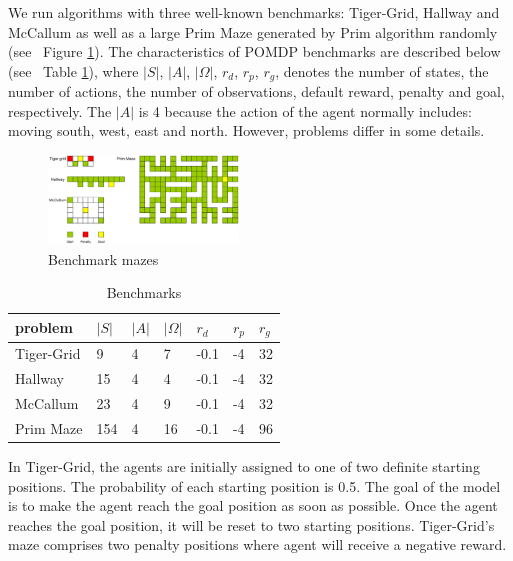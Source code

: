 \documentclass{article}
\begin{document}
We run algorithms with three well-known benchmarks: Tiger-Grid, Hallway and McCallum 
as well as a large Prim Maze generated by Prim algorithm randomly
(see ~Figure \ref{fig:mazes}). The characteristics of POMDP benchmarks are described
below (see ~Table \ref{table:benchmarks}), where $|S|$, $|A|$, $|\Omega|$, $r_d$, $r_p$, $r_g$, 
denotes the number of states, the number of actions, the number of observations, default
reward, penalty and goal, respectively. The $|A|$ is 4 because the action of the agent
normally includes: moving south, west, east and north. However, problems differ in some
details.

\begin{figure}[h]
  \centering
    \includegraphics[width=0.45\textwidth]{mazes.png}
  \caption{Benchmark mazes}
  \label{fig:mazes}
\end{figure}

\begin{table}[h]
  \caption{Benchmarks}
  \label{table:benchmarks}
  \centering
  \begin{tabular}{lllllll}
    \toprule
    problem         & $|S|$          & $|A|$          & $|\Omega|$  &$r_d$  &$r_p$  &$r_g$\\
    \midrule
    Tiger-Grid      & 9              & 4              & 7           & -0.1  & -4    & 32  \\
    Hallway         & 15             & 4              & 4           & -0.1  & -4    & 32  \\
    McCallum        & 23             & 4              & 9           & -0.1  & -4    & 32  \\
    Prim Maze       & 154            & 4              & 16          & -0.1  & -4    & 96  \\
    \bottomrule
  \end{tabular}
\end{table}

In Tiger-Grid, the agents are initially assigned to one of two definite starting positions.
The probability of each starting position is 0.5. The goal of the model is to make the agent
reach the goal position as soon as possible. Once the agent reaches the goal position,
it will be reset to two starting positions. Tiger-Grid's maze comprises two penalty positions
where agent will receive a negative reward. 
\end{document}
